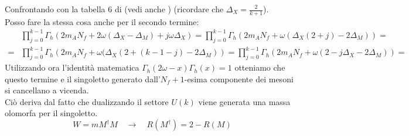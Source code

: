 \documentclass[a4paper,12pt]{article}
\begin{document}
Confrontando con la tabella 6 di \citep{Nii:2014jsa} (vedi anche \citep{Kim:2013cma}) (ricordare che $\Delta_X = \frac{2}{k+1}$).\\
Posso fare la stessa cosa anche per il secondo termine:
\begin{align*}
& \prod_{j=0}^{k-1} \Gamma_h \left( 2 m_A N_f + 2 \omega(\Delta_X - \Delta_M) + j \omega \Delta_X \right) = \prod_{j=0}^{k-1} \Gamma_h \left( 2 m_A N_f + \omega(\Delta_X ( 2 + j) - 2 \Delta_M)\right) = \\
= & \prod_{j=0}^{k-1} \Gamma_h \left( 2 m_A N_f + \omega(\Delta_X ( 2 + ( k - 1 - j) - 2 \Delta_M)\right) =  \prod_{j=0}^{k-1} \Gamma_h \left( 2 m_A N_f + \omega( 2 -j \Delta_X  - 2 \Delta_M)\right) =
\end{align*}
Utilizzando ora l'identità matematica $ \Gamma_h ( 2 \omega - x  ) \Gamma_h ( x  ) =  1 $ otteniamo che questo termine e il singoletto generato dall'$N_f+1$-esima componente dei mesoni si cancellano a vicenda.\\
Ciò deriva dal fatto che dualizzando il settore $U(k)$ viene generata una massa olomorfa per il singoletto. 
\begin{equation}
	W = m M^{\dagger} M \quad \longrightarrow \quad R(M^{\dagger}) = 2 - R (M)
\end{equation}
\end{document}
